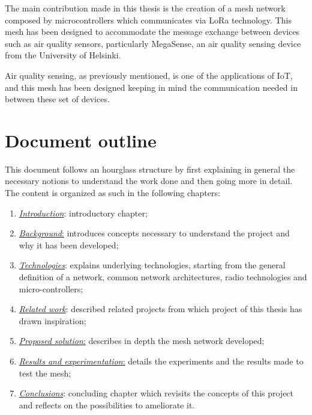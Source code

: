 		The main contribution made in this thesis is the creation of a mesh network composed by microcontrollers which communicates via LoRa technology.
		This mesh has been designed to accommodate the message exchange between devices such as air quality sensors, particularly MegaSense, an air quality sensing device from the University of Helsinki.
		
		Air quality sensing, as previously mentioned, is one of the applications of IoT, and this mesh has been designed keeping in mind the communication needed in between these set of devices.
		
	\section{Document outline}\label{sec:document_outline}
		
		This document follows an hourglass structure by first explaining in general the necessary notions to understand the work done and then going more in detail.
		The content is organized as such in the following chapters:
		\begin{enumerate}
			\item \hyperref[chapter:introduction]{\textit{Introduction}}: introductory chapter;
			\item \hyperref[chapter:background]{\textit{Background}:} introduces concepts necessary to understand the project and why it has been developed;
			\item \hyperref[chapter:technologies]{\textit{Technologies}}: explains underlying technologies, starting
			from the general definition of a network, common network architectures, radio technologies and micro-controllers;
			\item \hyperref[chapter:related_work]{\textit{Related work}}: described related projects from which project of this thesis has drawn inspiration;
			\item \hyperref[chapter:proposed_solution]{\textit{Proposed solution}:} describes in depth the mesh network developed;
			\item \hyperref[chapter:results]{\textit{Results and experimentation}:} details the experiments and the results made to test the mesh;
			\item \hyperref[chapter:conclusions]{\textit{Conclusions}}: concluding chapter which revisits the concepts of this project and reflects on the possibilities to ameliorate it.
			
		\end{enumerate}
